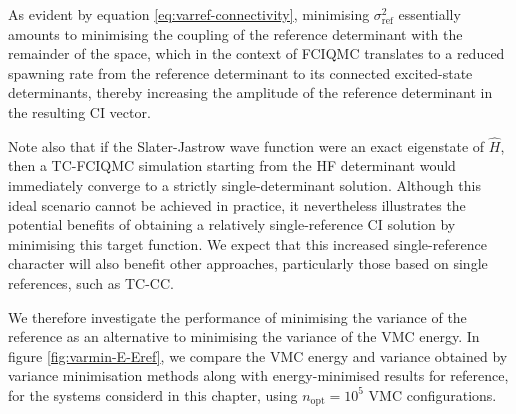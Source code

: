 As evident by equation \ref{eq:varref-connectivity}, minimising $\sigma_\mathrm{ref}^2$ essentially amounts to minimising the coupling of the reference determinant with the remainder of the space, which in the context of FCIQMC translates to a reduced spawning rate from the reference determinant to its connected excited-state determinants, thereby increasing the amplitude of the reference determinant in the resulting CI vector.

Note also that if the Slater-Jastrow wave function were an exact eigenstate of $\hat H$, then a TC-FCIQMC simulation starting from the HF determinant would immediately converge to a strictly single-determinant solution. Although this ideal scenario cannot be achieved in practice, it nevertheless illustrates the potential benefits of obtaining a relatively single-reference CI solution by minimising this target function. We expect that this increased single-reference character will also benefit other approaches, particularly those based on single references, such as TC-CC.

We therefore investigate the performance of minimising the variance of the reference as an alternative to minimising the variance of the VMC energy. In figure \ref{fig:varmin-E-Eref}, we compare the VMC energy and variance obtained by variance minimisation methods along with energy-minimised\supercite{nightingaleOptimization2001,toulouseOptimization2007,umrigarAlleviation2007} results for reference, for the systems considerd in this chapter, using $n_\mathrm{opt}=10^5$ VMC configurations.

